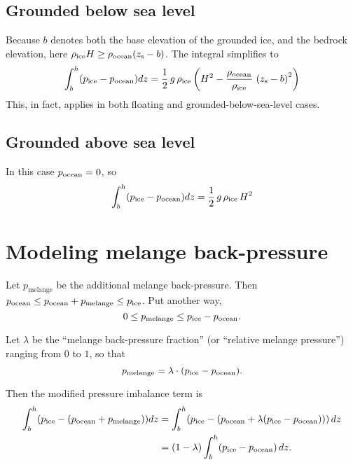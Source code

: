 \documentclass[11pt]{article}
\begin{document}
\subsection{Grounded below sea level}
\label{sec-5-2}

Because $b$ denotes both the base elevation of the grounded ice, and the bedrock elevation, here $\rho_{\text{ice}} H \ge \rho_{\text{ocean}} (z_{\text{s}} - b)$.  The integral simplifies to
\begin{equation*}
\int_{b}^{h}(p_{\text{ice}} - p_{\text{ocean}}) dz =
 \frac{1}{2}\, g\, \rho_{\text{ice}} \left(H^2-\frac{\rho_{\text{ocean}}}{\rho_{\text{ice}}}\, \left(z_{\text{s}}-b\right)^2\right)
\end{equation*}
This, in fact, applies in both floating and grounded-below-sea-level
cases.

\subsection{Grounded above sea level}
\label{sec-5-3}

In this case $p_{\text{ocean}} = 0$, so
\begin{equation*}
\int_{b}^{h}(p_{\text{ice}} - p_{\text{ocean}}) dz = \frac{1}{2}\, g\, \rho_{\text{ice}}\, H^2
\end{equation*}

\section{Modeling melange back-pressure}
\label{sec-6}

\newcommand{\pmelange}{p_{\text{melange}}}
Let $\pmelange$ be the additional melange back-pressure. Then $\psw \le \psw +
\pmelange \le \pice$. Put another way,
\begin{equation}
\label{eq:13}
0 \le \pmelange \le \pice - \psw.
\end{equation}

Let $\lambda$ be the ``melange back-pressure fraction'' (or ``relative
melange pressure'') ranging from $0$ to $1$, so that
\begin{equation}
\label{eq:14}
\pmelange = \lambda \cdot (\pice - \psw).
\end{equation}

Then the modified pressure imbalance term is
\begin{align}
\int_{b}^{h}(\pice - (\psw + \pmelange)) dz &= \int_{b}^{h}(\pice - (\psw + \lambda(\pice - \psw)))\, dz \notag
 \\
   &= (1 - \lambda) \int_{b}^{h} (\pice - \psw)\, dz.  \label{eq:15}
\end{align}


\small

\end{document}
